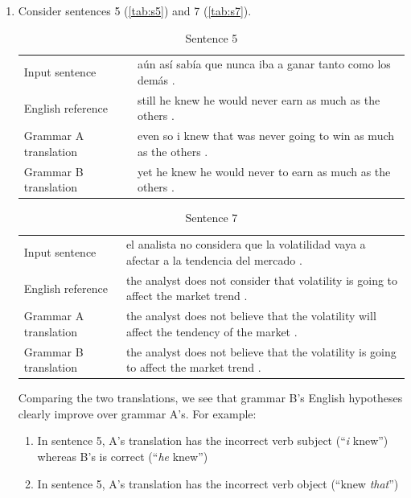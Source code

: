 \documentclass[a4paper,oneside,reqno]{amsart}
\begin{document}
\begin{enumerate}[label=\arabic*.]
    \begin{enumerate}[label=(\alph*)]
      \item
        Consider sentences 5 (\autoref{tab:s5}) and 7 (\autoref{tab:s7}).
        \begin{table}[h!]
          \begin{tabular}{p{5cm}p{10cm}}
            Input sentence & aún así sabía que nunca iba a ganar tanto como los demás . \\
            English reference & still he knew he would never earn as much as the others . \\
            Grammar A translation & even so i knew that was never going to win as much as the others . \\
            Grammar B translation & yet he knew he would never to earn as much as the others . \\
          \end{tabular}
          \caption{Sentence 5}
          \label{tab:s5}
        \end{table}
        \begin{table}[h!]
          \begin{tabular}{p{5cm}p{10cm}}
            Input sentence & el analista no considera que la volatilidad vaya a afectar a la tendencia del mercado .  \\
            English reference & the analyst does not consider that volatility is going to affect the market trend .  \\
            Grammar A translation & the analyst does not believe that the volatility will affect the tendency of the market .  \\
            Grammar B translation & the analyst does not believe that the volatility is going to affect the market trend .  \\
          \end{tabular}
          \caption{Sentence 7}
          \label{tab:s7}
        \end{table}
        Comparing the two translations, we see that grammar B's English
        hypotheses clearly improve over grammar A's. For example:
        \begin{enumerate}
          \item In sentence 5, A's translation has the incorrect verb subject
            (``\emph{i} knew'') whereas B's is correct (``\emph{he} knew'')
          \item In sentence 5, A's translation has the incorrect verb object (``knew \emph{that}'')

\end{enumerate}
\end{enumerate}
\end{enumerate}
\end{document}

